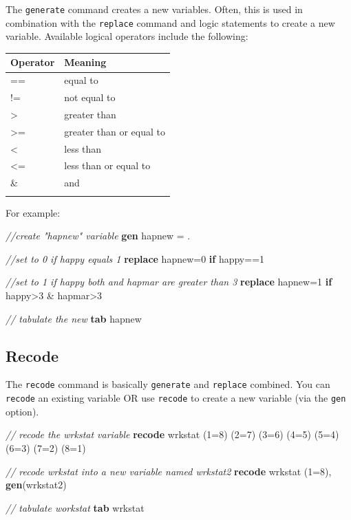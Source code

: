 \documentclass[
]{book}
\newenvironment{Shaded}{\begin{snugshade}}{\end{snugshade}}
\newcommand{\CommentTok}[1]{\textcolor[rgb]{0.56,0.35,0.01}{\textit{#1}}}
\newcommand{\KeywordTok}[1]{\textcolor[rgb]{0.13,0.29,0.53}{\textbf{#1}}}
\newcommand{\NormalTok}[1]{#1}
\begin{document}
The \texttt{generate} command creates a new variables. Often, this is used in combination with the \texttt{replace} command and logic statements to create a new variable. Available logical operators include the following:

\begin{longtable}[]{@{}ll@{}}
\toprule
Operator & Meaning\tabularnewline
\midrule
\endhead
== & equal to\tabularnewline
!= & not equal to\tabularnewline
\textgreater{} & greater than\tabularnewline
\textgreater= & greater than or equal to\tabularnewline
\textless{} & less than\tabularnewline
\textless= & less than or equal to\tabularnewline
\& & and\tabularnewline
&\tabularnewline
\bottomrule
\end{longtable}

For example:

\begin{Shaded}
\begin{Highlighting}[]
\CommentTok{//create "hapnew" variable}
\KeywordTok{gen}\NormalTok{ hapnew = .}

\CommentTok{//set to 0 if happy equals 1}
\KeywordTok{replace}\NormalTok{ hapnew=0 }\KeywordTok{if}\NormalTok{ happy==1 }

\CommentTok{//set to 1 if happy both and hapmar are greater than 3}
\KeywordTok{replace}\NormalTok{ hapnew=1 }\KeywordTok{if}\NormalTok{ happy\textgreater{}3 \& hapmar\textgreater{}3}

\CommentTok{// tabulate the new }
\KeywordTok{tab}\NormalTok{ hapnew}
\end{Highlighting}
\end{Shaded}

\hypertarget{recode}{%
\subsection{Recode}\label{recode}}

The \texttt{recode} command is basically \texttt{generate} and \texttt{replace} combined. You can \texttt{recode} an existing variable OR use \texttt{recode} to create a new variable (via the \texttt{gen} option).

\begin{Shaded}
\begin{Highlighting}[]
\CommentTok{// recode the wrkstat variable }
\KeywordTok{recode}\NormalTok{ wrkstat (1=8) (2=7) (3=6) (4=5) (5=4) (6=3) (7=2) (8=1)}

\CommentTok{// recode wrkstat into a new variable named wrkstat2}
\KeywordTok{recode}\NormalTok{ wrkstat (1=8), }\KeywordTok{gen}\NormalTok{(wrkstat2)}

\CommentTok{// tabulate workstat}
\KeywordTok{tab}\NormalTok{ wrkstat}
\end{Highlighting}
\end{Shaded}
\end{document}
